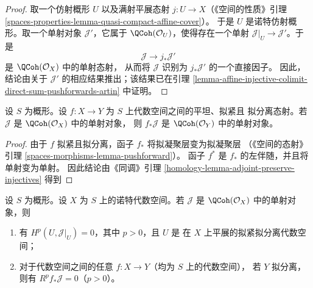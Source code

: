\begin{proof}
取一个仿射概形 $U$ 以及满射平展态射 $j : U \to X$（《空间的性质》引理
\ref{spaces-properties-lemma-quasi-compact-affine-cover}）。
于是 $U$ 是诺特仿射概形。取一个单射对象 $\mathcal{J}'$，它属于
$\QCoh(\mathcal{O}_U)$，使得存在一个单射 $\mathcal{J}|_U \to \mathcal{J}'$。于是
$$
\mathcal{J} \to j_*\mathcal{J}'
$$
是 $\QCoh(\mathcal{O}_X)$ 中的单射态射，
从而将 $\mathcal{J}$ 识别为 $j_*\mathcal{J}'$ 的一个直接因子。
因此，结论由关于 $\mathcal{J}'$ 的相应结果推出；该结果已在引理
\ref{lemma-affine-injective-colimit-direct-sum-pushforwards-artin} 中证明。
\end{proof}

\begin{lemma}
\label{lemma-flat-pullback-injective-quasi-coherent}
设 $S$ 为概形。设 $f : X \to Y$ 为 $S$ 上代数空间之间的平坦、拟紧且
拟分离态射。若 $\mathcal{J}$ 是 $\QCoh(\mathcal{O}_X)$ 中的单射对象，
则 $f_*\mathcal{J}$ 是 $\QCoh(\mathcal{O}_Y)$ 中的单射对象。
\end{lemma}

\begin{proof}
由于 $f$ 拟紧且拟分离，函子 $f_*$ 将拟凝聚层变为拟凝聚层
（《空间的态射》引理 \ref{spaces-morphisms-lemma-pushforward}）。
函子 $f^*$ 是 $f_*$ 的左伴随，并且将单射变为单射。
因此结论由《同调》引理
\ref{homology-lemma-adjoint-preserve-injectives} 得到 %
\end{proof}

\begin{lemma}
\label{lemma-injective-pushforward}
设 $S$ 为概形。设 $X$ 为 $S$ 上的诺特代数空间。若
$\mathcal{J}$ 是 $\QCoh(\mathcal{O}_X)$ 中的单射对象，则
\begin{enumerate}
\item 有 $H^p(U, \mathcal{J}|_U) = 0$，其中 $p > 0$，且 $U$ 是
在 $X$ 上平展的拟紧拟分离代数空间；
\item 对于代数空间之间的任意 $f : X \to Y$（均为 $S$ 上的代数空间），
若 $Y$ 拟分离，则有 $R^pf_*\mathcal{J} = 0$（$p > 0$）。
\end{enumerate}
\end{lemma}

